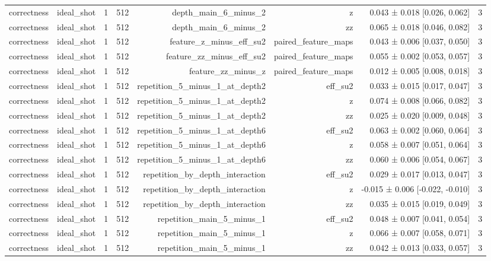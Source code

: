 \begin{table}
\begin{tabular}{lrrrrrrr}
correctness & ideal\_shot & 1 & 512 & depth\_main\_6\_minus\_2 & z & 0.043 ± 0.018 [0.026, 0.062] & 3 \\
correctness & ideal\_shot & 1 & 512 & depth\_main\_6\_minus\_2 & zz & 0.065 ± 0.018 [0.046, 0.082] & 3 \\
correctness & ideal\_shot & 1 & 512 & feature\_z\_minus\_eff\_su2 & paired\_feature\_maps & 0.043 ± 0.006 [0.037, 0.050] & 3 \\
correctness & ideal\_shot & 1 & 512 & feature\_zz\_minus\_eff\_su2 & paired\_feature\_maps & 0.055 ± 0.002 [0.053, 0.057] & 3 \\
correctness & ideal\_shot & 1 & 512 & feature\_zz\_minus\_z & paired\_feature\_maps & 0.012 ± 0.005 [0.008, 0.018] & 3 \\
correctness & ideal\_shot & 1 & 512 & repetition\_5\_minus\_1\_at\_depth2 & eff\_su2 & 0.033 ± 0.015 [0.017, 0.047] & 3 \\
correctness & ideal\_shot & 1 & 512 & repetition\_5\_minus\_1\_at\_depth2 & z & 0.074 ± 0.008 [0.066, 0.082] & 3 \\
correctness & ideal\_shot & 1 & 512 & repetition\_5\_minus\_1\_at\_depth2 & zz & 0.025 ± 0.020 [0.009, 0.048] & 3 \\
correctness & ideal\_shot & 1 & 512 & repetition\_5\_minus\_1\_at\_depth6 & eff\_su2 & 0.063 ± 0.002 [0.060, 0.064] & 3 \\
correctness & ideal\_shot & 1 & 512 & repetition\_5\_minus\_1\_at\_depth6 & z & 0.058 ± 0.007 [0.051, 0.064] & 3 \\
correctness & ideal\_shot & 1 & 512 & repetition\_5\_minus\_1\_at\_depth6 & zz & 0.060 ± 0.006 [0.054, 0.067] & 3 \\
correctness & ideal\_shot & 1 & 512 & repetition\_by\_depth\_interaction & eff\_su2 & 0.029 ± 0.017 [0.013, 0.047] & 3 \\
correctness & ideal\_shot & 1 & 512 & repetition\_by\_depth\_interaction & z & -0.015 ± 0.006 [-0.022, -0.010] & 3 \\
correctness & ideal\_shot & 1 & 512 & repetition\_by\_depth\_interaction & zz & 0.035 ± 0.015 [0.019, 0.049] & 3 \\
correctness & ideal\_shot & 1 & 512 & repetition\_main\_5\_minus\_1 & eff\_su2 & 0.048 ± 0.007 [0.041, 0.054] & 3 \\
correctness & ideal\_shot & 1 & 512 & repetition\_main\_5\_minus\_1 & z & 0.066 ± 0.007 [0.058, 0.071] & 3 \\
correctness & ideal\_shot & 1 & 512 & repetition\_main\_5\_minus\_1 & zz & 0.042 ± 0.013 [0.033, 0.057] & 3 \\

\end{tabular}
\end{table}
